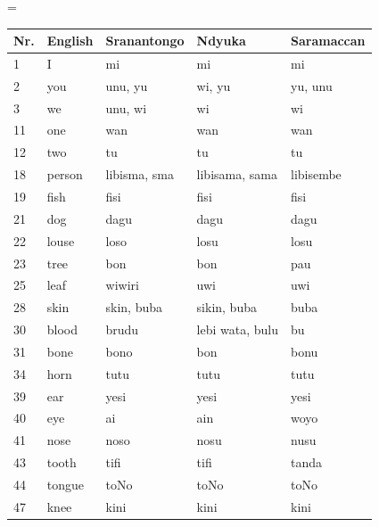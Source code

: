 \LTcapwidth=\textwidth
    \noindent\begin{longtable}{ p{}p{}|p{}p{}p{} }
    \hline
    Nr.	&	English	    &	Sranantongo	    &	Ndyuka	            &	Saramaccan \\
    \hline\endhead
    1	&	I	        &	mi	            &	mi	                &	mi  \\
    2	&	you	        &	unu, yu	        &	wi, yu	            &	yu, unu  \\
    3	&	we	        &	unu, wi	        &	wi	                &	wi  \\
    11	&	one	        &	wan	            &	wan	                &	wan  \\
    12	&	two	        &	tu	            &	tu	                &	tu  \\
    18	&	person	    &	libisma, sma	&	libisama, sama	    &	libisembe  \\
    19	&	fish	    &	fisi	        &	fisi	            &	fisi  \\
    21	&	dog	        &	dagu	        &	dagu	            &	dagu  \\
    22	&	louse	    &	loso	        &	losu	            &	losu  \\
    23	&	tree	    &	bon	            &	bon	                &	pau  \\
    25	&	leaf	    &	wiwiri	        &	uwi	                &	uwi  \\
    28	&	skin	    &	skin, buba	    &	sikin, buba	        &	buba  \\
    30	&	blood	    &	brudu	        &	lebi wata, bulu	    &	bu  \\
    31	&	bone	    &	bono	        &	bon	                &	bonu  \\
    34	&	horn	    &	tutu	        &	tutu	            &	tutu  \\
    39	&	ear	        &	yesi	        &	yesi	            &	yesi  \\
    40	&	eye	        &	ai	            &	ain	                &	woyo  \\
    41	&	nose	    &	noso	        &	nosu	            &	nusu  \\
    43	&	tooth	    &	tifi	        &	tifi	            &	tanda  \\
    44	&	tongue	    &	toNo	        &	toNo	            &	toNo  \\
    47	&	knee	    &	kini	        &	kini	            &	kini  \\

\end{longtable}
